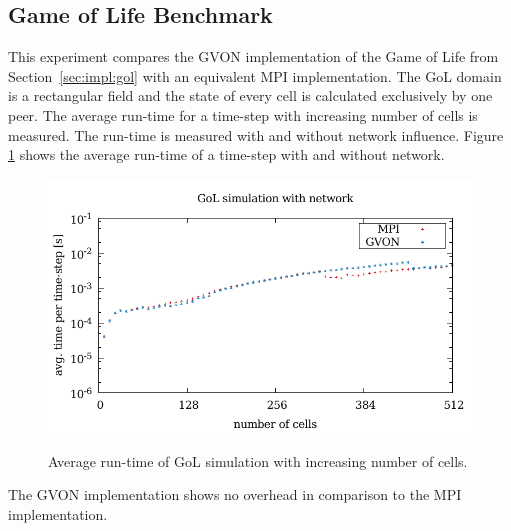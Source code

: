 \subsection{Game of Life Benchmark}
This experiment compares the GVON implementation of the Game of Life
from Section~\ref{sec:impl:gol} with an equivalent MPI
implementation. The GoL domain is a rectangular field and the state of
every cell is calculated exclusively by one peer. The average run-time
for a time-step with increasing number of cells is measured. The
run-time is measured with and without network influence.  Figure
\ref{fig:gol_laser} shows the average run-time of a time-step with and
without network.

\begin{figure}[H]
    \includegraphics[width=\textwidth]{plots/50_gol_network_laser}
  \label{fig:gol_laser}
  \caption{Average run-time of GoL simulation with increasing number
    of cells.}
\end{figure}

The GVON implementation shows no overhead in comparison to the MPI
implementation.


